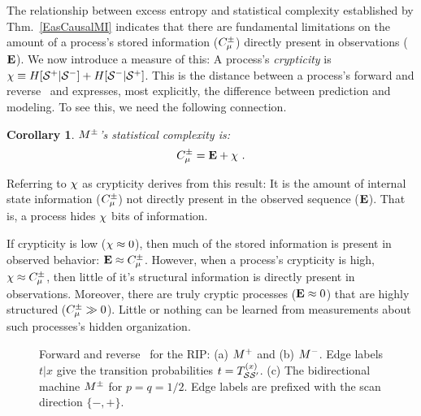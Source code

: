 \documentclass[prl,twocolumn,showpacs,superscriptaddress,preprintnumbers,floatfix]{revtex4}
\theoremstyle{plain}    \newtheorem{Lem}{Lemma}
\theoremstyle{plain}    \newtheorem*{ProLem}{Proof}
\theoremstyle{plain} 	\newtheorem{Cor}{Corollary}
\theoremstyle{plain} 	\newtheorem*{ProCor}{Proof}
\theoremstyle{plain} 	\newtheorem{The}{Theorem}
\theoremstyle{plain} 	\newtheorem*{ProThe}{Proof}
\theoremstyle{plain} 	\newtheorem{Prop}{Proposition}
\theoremstyle{plain} 	\newtheorem*{ProProp}{Proof}
\theoremstyle{plain} 	\newtheorem*{Conj}{Conjecture}
\theoremstyle{plain}	\newtheorem*{Rem}{Remark}
\theoremstyle{plain}	\newtheorem*{Def}{Definition}
\theoremstyle{plain}	\newtheorem*{Not}{Notation}
\begin{document}
The relationship between excess entropy and statistical complexity established
by Thm.~\ref{EasCausalMI} indicates that there are fundamental limitations on
the amount of a process's stored information ($C_\mu^{\pm}$) directly present in
observations (${\bf E}$). We now introduce a measure of this: A process's
\emph{crypticity} is
$\chi \equiv H[{\mathcal{S}}^+|{\mathcal{S}}^-]
+ H[{\mathcal{S}}^-|{\mathcal{S}}^+]$.
This is the distance between a process's forward and reverse \eMs\ and
expresses, most explicitly, the difference between prediction and modeling.
To see this, we need the following connection.
\begin{Cor}
${M}^{\pm}$'s statistical complexity is:
\vspace{-0.07in}
\begin{equation}
C_\mu^{\pm} = {\bf E} + \chi ~.
\end{equation}
\end{Cor}
\vspace{-0.07in}
\noindent
Referring to $\chi$ as crypticity derives from this result: It
is the amount of internal state information ($C_\mu^{\pm}$) not directly
present in the observed sequence (${\bf E}$). That is, a process hides
$\chi$ bits of information.

If crypticity is low ($\chi \approx 0$), then much of the stored
information is present in observed behavior: ${\bf E} \approx C_\mu^{\pm}$. However,
when a process's crypticity is high, $\chi \approx C_\mu^{\pm}$, then little of
it's structural information is directly present in observations. Moreover,
there are truly cryptic processes (${\bf E} \approx 0$) that are highly
structured ($C_\mu^{\pm} \gg 0$). Little or nothing can be learned from measurements
about such processes's hidden organization.

\begin{figure}[th]
\begin{center}
\end{center}
\caption{
  Forward and reverse \eMs\ for the RIP: (a) ${M}^+$ and (b) ${M}^-$.
  Edge labels $t|x$ give the transition probabilities
  $t = T_{\mathcal{S} \mathcal{S}^\prime}^{(x)}$.
  (c) The bidirectional machine ${M}^{\pm}$ for $p = q = 1/2$.
  Edge labels are prefixed with the scan direction $\{-,+\}$.
  }
\label{fig:RIP}
\end{figure}
\end{document}
